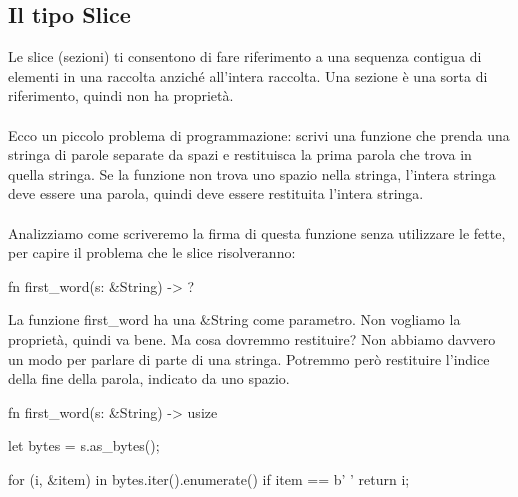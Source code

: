 \documentclass[11pt,a4paper]{article}
\begin{document}
{\subsection{Il tipo Slice}

Le slice (sezioni) ti consentono di fare riferimento a una sequenza contigua di elementi in una raccolta anziché all'intera raccolta. Una sezione è una sorta di riferimento, quindi non ha proprietà.\\
\\
Ecco un piccolo problema di programmazione: scrivi una funzione che prenda una stringa di parole separate da spazi e restituisca la prima parola che trova in quella stringa. Se la funzione non trova uno spazio nella stringa, l'intera stringa deve essere una parola, quindi deve essere restituita l'intera stringa.\\
\\
Analizziamo come scriveremo la firma di questa funzione senza utilizzare le fette, per capire il problema che le slice risolveranno:
\begin{rust}
fn first_word(s: &String) -> ?
\end{rust}

La funzione first\_word ha una \&String come parametro. Non vogliamo la proprietà, quindi va bene. Ma cosa dovremmo restituire? Non abbiamo davvero un modo per parlare di parte di una stringa. Potremmo però restituire l'indice della fine della parola, indicato da uno spazio.
\begin{rust}
fn first_word(s: &String) -> usize {
    let bytes = s.as_bytes();

    for (i, &item) in bytes.iter().enumerate() {
        if item == b' ' {
            return i;
        }
    }

}
\end{rust}}
\end{document}

